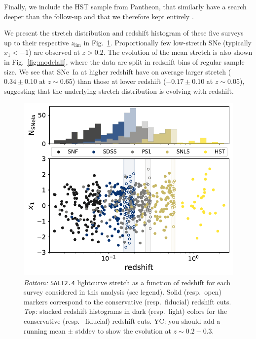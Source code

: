 \documentclass[]{aa}
\newcommand{\nn}[1]{\textcolor[rgb]{0.4, 0.8, 0}{#1}}
\newcommand{\yc}[1]{\textcolor[RGB]{217, 22, 102}{#1}}
\begin{document}
Finally, we include the HST sample from Pantheon, that similarly have a search
deeper than the follow-up and that we therefore kept entirely
\citep{strolger04}.

We present the stretch distribution and redshift histogram of these five surveys
up to their respective $z_{\lim}$ in Fig.~\ref{fig:sample}. \nn{Proportionally
few low-stretch SNe (typically $x_1 < -1$) are observed at $z>0.2$}. The
evolution of the mean stretch is also shown in Fig.~\ref{fig:modelall}, where
the data are split in redshift bins of regular sample size. We see that SNe~Ia
at higher redshift have on average larger stretch ($0.34 \pm 0.10$ at
$z\sim0.65$) than those at lower redshift ($-0.17\pm 0.10$ at $z\sim0.05$),
suggesting that the underlying stretch distribution is evolving with redshift.

\begin{figure}
    \centering
    \includegraphics[width=0.95\linewidth]{Article_figures/stretchs-cut_btw_hist_stac_75-lb-cividis.pdf}
    \caption{\textit{Bottom:} \textsc{\texttt{SALT2.4}} lightcurve stretch as a
        function of redshift for each survey considered in this analysis (see
        legend). Solid (resp.\ open) markers correspond to the conservative
        (resp.\ fiducial) redshift cuts. \textit{Top:} stacked redshift
    histograms in dark (resp.\ light) colors for the conservative (resp.  \
fiducial) redshift cuts. \yc{YC: you should add a running mean $\pm$ stddev to
show the evolution at $z \sim 0.2-0.3$.}}
    \label{fig:sample}
\end{figure}
\end{document}
